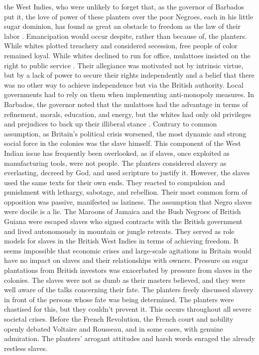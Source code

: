 the West Indies, who were unlikely to forget that, as the governor of Barbados put it, the love of power of these planters over the poor Negroes, each in his little sugar dominion, has found as great an obstacle to freedom as the law of their labor . Emancipation would occur despite, rather than because of, the planters. While whites plotted treachery and considered secession, free people of color remained loyal. While whites declined to run for office, mulattoes insisted on the right to public service . Their allegiance was motivated not by intrinsic virtue, but by a lack of power to secure their rights independently and a belief that there was no other way to achieve independence but via the British authority. Local governments had to rely on them when implementing anti-monopoly measures. In Barbados, the governor noted that the mulattoes had the advantage in terms of refinement, morals, education, and energy, but the whites had only old privileges and prejudices to back up their illiberal stance . Contrary to common assumption, as Britain's political crisis worsened, the most dynamic and strong social force in the colonies was the slave himself. This component of the West Indian issue has frequently been overlooked, as if slaves, once exploited as manufacturing tools, were not people. The planters considered slavery as everlasting, decreed by God, and used scripture to justify it. However, the slaves used the same texts for their own ends. They reacted to compulsion and punishment with lethargy, sabotage, and rebellion. Their most common form of opposition was passive, manifested as laziness. The assumption that Negro slaves were docile is a lie. The Maroons of Jamaica and the Bush Negroes of British Guiana were escaped slaves who signed contracts with the British government and lived autonomously in mountain or jungle retreats. They served as role models for slaves in the British West Indies in terms of achieving freedom. It seems impossible that economic crises and large-scale agitations in Britain would have no impact on slaves and their relationships with owners. Pressure on sugar plantations from British investors was exacerbated by pressure from slaves in the colonies. The slaves were not as dumb as their masters believed, and they were well aware of the talks concerning their fate. The planters freely discussed slavery in front of the persons whose fate was being determined. The planters were chastised for this, but they couldn't prevent it. This occurs throughout all severe societal crises. Before the French Revolution, the French court and nobility openly debated Voltaire and Rousseau, and in some cases, with genuine admiration. The planters' arrogant attitudes and harsh words enraged the already restless slaves.